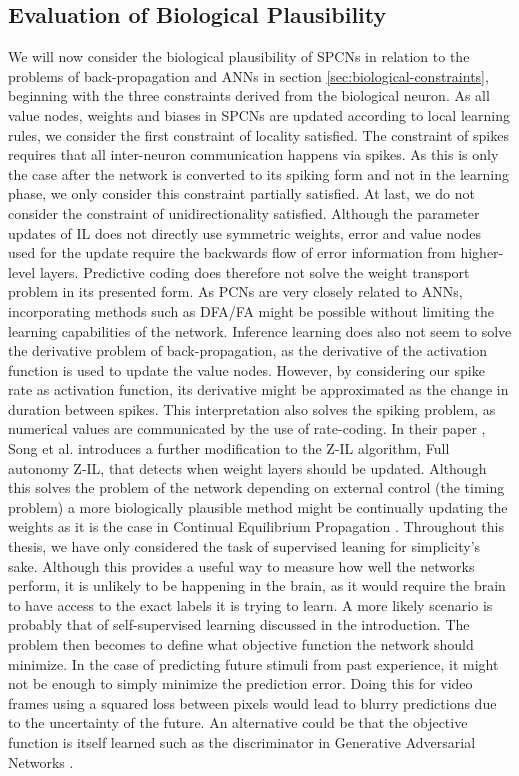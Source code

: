 \documentclass[a4paper,11pt]{article}
\begin{document}
\subsection{Evaluation of Biological Plausibility}
We will now consider the biological plausibility of SPCNs in relation to the problems of back-propagation and ANNs in section \ref{sec:biological-constraints}, beginning with the three constraints derived from the biological neuron. As all value nodes, weights and biases in SPCNs are updated according to local learning rules, we consider the first constraint of locality satisfied. The constraint of spikes requires that all inter-neuron communication happens via spikes. As this is only the case after the network is converted to its spiking form and not in the learning phase, we only consider this constraint partially satisfied. At last, we do not consider the constraint of unidirectionality satisfied. Although the parameter updates of IL does not directly use symmetric weights, error and value nodes used for the update require the backwards flow of error information from higher-level layers. Predictive coding does therefore not solve the weight transport problem in its presented form. As PCNs are very closely related to ANNs, incorporating methods such as DFA/FA might be possible without limiting the learning capabilities of the network. Inference learning does also not seem to solve the derivative problem of back-propagation, as the derivative of the activation function is used to update the value nodes. However, by considering our spike rate as activation function, its derivative might be approximated as the change in duration between spikes. This interpretation also solves the spiking problem, as numerical values are communicated by the use of rate-coding. In their paper \cite{PredictiveCodingNetworks}, Song et al. introduces a further modification to the Z-IL algorithm, Full autonomy Z-IL, that detects when weight layers should be updated. Although this solves the problem of the network depending on external control (the timing problem) a more biologically plausible method might be continually updating the weights as it is the case in Continual Equilibrium Propagation \cite{ContinualEqProp}.  Throughout this thesis, we have only considered the task of supervised leaning for simplicity's sake. Although this provides a useful way to measure how well the networks perform, it is unlikely to be happening in the brain, as it would require the brain to have access to the exact labels it is trying to learn. A more likely scenario is probably that of self-supervised learning discussed in the introduction. The problem then becomes to define what objective function the network should minimize. In the case of predicting future stimuli from past experience, it might not be enough to simply minimize the prediction error. Doing this for video frames using a squared loss between pixels would lead to blurry predictions due to the uncertainty of the future. An alternative could be that the objective function is itself learned such as the discriminator in Generative Adversarial Networks \cite{goodfellow2014generative}. 
\end{document}
